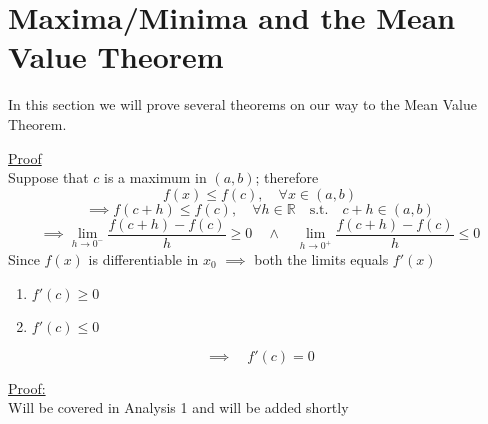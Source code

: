 \documentclass{book}
\newtheorem{theorem}{Theorem}[section]
\newcommand{\R}{\mathbb{R}}
\begin{document}
\section{Maxima/Minima and the Mean Value Theorem}
In this section we will prove several theorems on our way to the Mean Value Theorem.
\begin{tcolorbox}[width=\textwidth,colback={mygray},title={{\bf Fermat's Theorem}\\\begin{theorem} Let $f(x)$ be defined and smooth on $(a,b)$. Let $c\in(a,b)$ such that $c$ is either a maximum or a maximum. Then $f'(c)=0$\end{theorem}},colbacktitle=myblue,coltitle=black]    
\underline{Proof}\\

Suppose that $c$ is a maximum in $(a,b)$; therefore
$$f(x) \le f(c), \quad \forall x \in (a,b)$$
$$ \implies f(c+h) \le f(c), \quad \forall h \in \R \quad \textrm{s.t.} \quad c+h \in (a,b)$$
$$ \implies \lim_{h \to 0^-} \frac{f(c+h)-f(c)}{h} \ge 0 \quad \land \quad \lim_{h \to 0^+} \frac{f(c+h)-f(c)}{h} \le 0 $$
Since $f(x)$ is differentiable in $x_0$ $\implies$ both the limits equals $f'(x)$

\begin{enumerate} \item $f'(c) \ge 0$ \item $f'(c) \le 0$ \end{enumerate} $$\implies \quad f'(c)=0$$

\end{tcolorbox}

\begin{tcolorbox}[width=\textwidth,colback={mygray},title={{\bf Extreme Value Theorem or Weierstrass' Theorem}\\\begin{theorem} $f$ continuous on an interval $[a,b]$ then $f$ has a maximum and a minimum on $[a,b]$\end{theorem}},colbacktitle=myblue,coltitle=black]    
\underline{Proof:}\\ Will be covered in Analysis 1 and will be added shortly
\end{tcolorbox}
\end{document}
